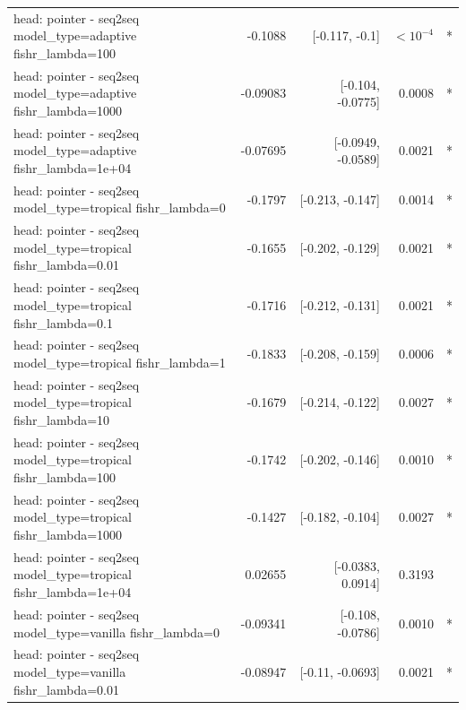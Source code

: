 \documentclass[10pt]{article}
\makeatletter
\newcommand{\stackcell}[1]{\begin{tabular}[t]{@{}l@{}}#1\end{tabular}}
\makeatother
\begin{document}
{\begin{longtable}{lrrrl}
\stackcell{head: pointer - seq2seq\\\footnotesize model\_type=adaptive fishr\_lambda=100 } & -0.1088 & [-0.117, -0.1] & $<10^{-4}$ & *\\
\stackcell{head: pointer - seq2seq\\\footnotesize model\_type=adaptive fishr\_lambda=1000 } & -0.09083 & [-0.104, -0.0775] & 0.0008 & *\\
\stackcell{head: pointer - seq2seq\\\footnotesize model\_type=adaptive fishr\_lambda=1e+04 } & -0.07695 & [-0.0949, -0.0589] & 0.0021 & *\\
\stackcell{head: pointer - seq2seq\\\footnotesize model\_type=tropical fishr\_lambda=0 } & -0.1797 & [-0.213, -0.147] & 0.0014 & *\\
\stackcell{head: pointer - seq2seq\\\footnotesize model\_type=tropical fishr\_lambda=0.01 } & -0.1655 & [-0.202, -0.129] & 0.0021 & *\\
\stackcell{head: pointer - seq2seq\\\footnotesize model\_type=tropical fishr\_lambda=0.1 } & -0.1716 & [-0.212, -0.131] & 0.0021 & *\\
\stackcell{head: pointer - seq2seq\\\footnotesize model\_type=tropical fishr\_lambda=1 } & -0.1833 & [-0.208, -0.159] & 0.0006 & *\\
\stackcell{head: pointer - seq2seq\\\footnotesize model\_type=tropical fishr\_lambda=10 } & -0.1679 & [-0.214, -0.122] & 0.0027 & *\\
\stackcell{head: pointer - seq2seq\\\footnotesize model\_type=tropical fishr\_lambda=100 } & -0.1742 & [-0.202, -0.146] & 0.0010 & *\\
\stackcell{head: pointer - seq2seq\\\footnotesize model\_type=tropical fishr\_lambda=1000 } & -0.1427 & [-0.182, -0.104] & 0.0027 & *\\
\stackcell{head: pointer - seq2seq\\\footnotesize model\_type=tropical fishr\_lambda=1e+04 } & 0.02655 & [-0.0383, 0.0914] & 0.3193 & \\
\stackcell{head: pointer - seq2seq\\\footnotesize model\_type=vanilla fishr\_lambda=0 } & -0.09341 & [-0.108, -0.0786] & 0.0010 & *\\
\stackcell{head: pointer - seq2seq\\\footnotesize model\_type=vanilla fishr\_lambda=0.01 } & -0.08947 & [-0.11, -0.0693] & 0.0021 & *\\

\end{longtable}}
\end{document}
